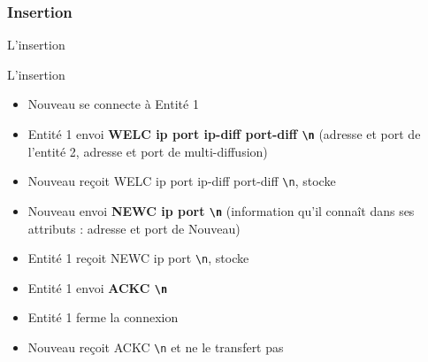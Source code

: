 \documentclass{beamer}
\newcommand*{\escape}[1]{\texttt{\textbackslash#1}}
\begin{document}
\subsubsection{Insertion}
\begin{frame}
	\begin{center}
		{\Huge L'insertion}
	\end{center}
\end{frame}
\begin{frame}{L'insertion}
	\begin{itemize}
		\item<2-6> Nouveau se connecte à Entité 1
		\item<3-6> Entité 1 envoi \textbf{WELC ip port ip-diff port-diff \escape{n}} (adresse et port de l’entité 2, adresse et port de multi-diffusion)
		\item<3-6> Nouveau reçoit WELC ip port ip-diff port-diff \escape{n}, stocke
		\item<4-6> Nouveau envoi \textbf{NEWC ip port \escape{n}} (information qu'il connaît dans ses attributs : adresse et port de Nouveau)
		\item<4-6> Entité 1 reçoit NEWC ip port \escape{n}, stocke
		\item<5-6> Entité 1 envoi \textbf{ACKC \escape{n}}
		\item<6-6> Entité 1 ferme la connexion
		\item<5-6> Nouveau reçoit ACKC \escape{n} et ne le transfert pas
	\end{itemize}
\end{frame}
\end{document}
